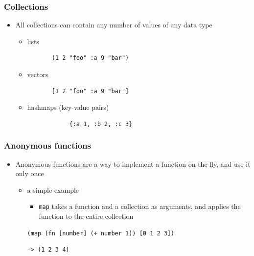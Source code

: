 \documentclass{beamer}
\begin{document}
\begin{frame}[fragile]
\frametitle{Collections}
    \begin{itemize}
     \item All collections can contain any number of values of any data type
	 \begin{itemize}
	  \item lists
	  \begin{verbatim}
	   (1 2 "foo" :a 9 "bar")
	  \end{verbatim}
  	  \item vectors
  	  \begin{verbatim}
	   [1 2 "foo" :a 9 "bar"]
	  \end{verbatim}
  	  \item hashmaps (key-value pairs)
  	  \begin{verbatim}
	    	{:a 1, :b 2, :c 3}
	  \end{verbatim}
	 \end{itemize}
    \end{itemize}
\end{frame}

\begin{frame}[fragile]
\frametitle{Anonymous functions}
	\begin{itemize}
  	  \item Anonymous functions are a way to implement a function on the fly, and use it only once
  	  \begin{itemize}
  	    \item a simple example
  	    \begin{itemize}
  	 	  \item \texttt{map} takes a function and a collection as arguments, and applies the function to the entire collection
  	    \end{itemize}
  	    
		\texttt{(map (fn [number] (+ number 1)) [0 1 2 3])}
		
		\texttt{-> (1 2 3 4)}
	 \end{itemize}
   \end{itemize}
\end{frame}
\end{document}
